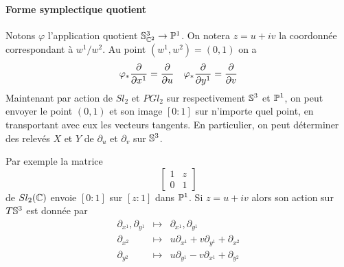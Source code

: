 \documentclass[a4paper,10pt]{article}
\begin{document}
\paragraph{Forme symplectique quotient} Notons $\varphi$ l'application quotient $ \S^3_{\C^2} \rightarrow \Pro^1$. On notera $z=u+iv$ la coordonnée correspondant à $w^1/w^2$. Au point $(w^1,w^2) = (0,1)$ on a
\[
\varphi_* \dpp{}{x^1} = \dpp{}{u} \quad 
\varphi_* \dpp{}{y^1} = \dpp{}{v}
\]
Maintenant par action de $Sl_2$ et $PGl_2$ sur respectivement $\S^3$ et $\Pro^1$, on peut envoyer le point $(0,1)$ et son image $[0:1]$ sur n'importe quel point, en transportant avec eux les vecteurs tangents. En particulier, on peut déterminer des relevés $X$ et $Y$ de $\partial_u$ et $\partial_v$ sur $\S^3$.

Par exemple la matrice
\[
\begin{bmatrix}
1 & z\\
0 & 1
\end{bmatrix}
\]
de $Sl_2(\C)$ envoie $[0:1]$ sur $[z:1]$ dans $\Pro^1$. Si $z=u+iv$ alors son action sur $T\S^3$ est donnée par
\begin{eqnarray*}
\partial_{x^1}, \partial_{y^1} & \mapsto & \partial_{x^1}, \partial_{y^1}\\
\partial_{x^2} & \mapsto & u\partial_{x^1}+v\partial_{y^1} + \partial_{x^2}\\
\partial_{y^2} & \mapsto & u\partial_{y^1}-v \partial_{x^1}+ \partial_{y^2}
\end{eqnarray*}

\fi


\nocite{*}

\end{document}
